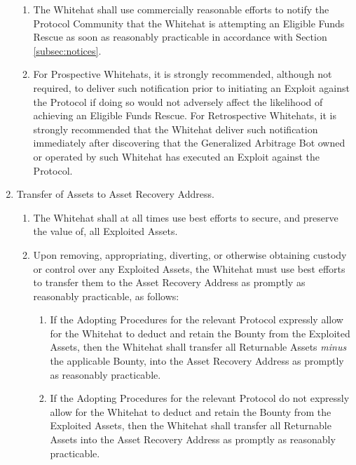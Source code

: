 \documentclass{article}
\begin{document}
\begin{enumerate}
          \begin{enumerate}
              \item The Whitehat shall use commercially reasonable efforts to notify the Protocol Community that the Whitehat is attempting an Eligible Funds Rescue as soon as reasonably practicable in accordance with Section \ref{subsec:notices}.

              \item For Prospective Whitehats, it is strongly recommended, although not required, to deliver such notification prior to initiating an Exploit against the Protocol if doing so would not adversely affect the likelihood of achieving an Eligible Funds Rescue. For Retrospective Whitehats, it is strongly recommended that the Whitehat deliver such notification immediately after discovering that the Generalized Arbitrage Bot owned or operated by such Whitehat has executed an Exploit against the Protocol.

          \end{enumerate}
    \item Transfer of Assets to Asset Recovery Address.\label{subsec:transfer_assets}

          \begin{enumerate}
              \item The Whitehat shall at all times use best efforts to secure, and preserve the value of, all Exploited Assets.

              \item Upon removing, appropriating, diverting, or otherwise obtaining custody or control over any Exploited Assets, the Whitehat must use best efforts to transfer them to the Asset Recovery Address as promptly as reasonably practicable, as follows:

                    \begin{enumerate}
                        \item If the Adopting Procedures for the relevant Protocol expressly allow for the Whitehat to deduct and retain the Bounty from the Exploited Assets, then the Whitehat shall transfer all Returnable Assets \textit{minus} the applicable Bounty, into the Asset Recovery Address as promptly as reasonably practicable.

                        \item If the Adopting Procedures for the relevant Protocol do not expressly allow for the Whitehat to deduct and retain the Bounty from the Exploited Assets, then the Whitehat shall transfer all Returnable Assets into the Asset Recovery Address as promptly as reasonably practicable.
                    \end{enumerate}


\end{enumerate}
\end{enumerate}
\end{document}
